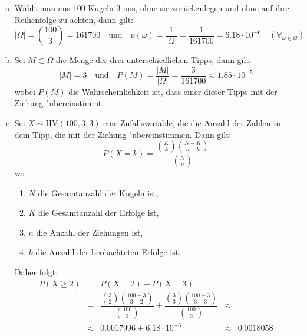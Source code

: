 \documentclass[10pt, oneside]{article}
\begin{document}
\begin{enumerate}[(a)]
    \item Wählt man aus 100 Kugeln 3 aus, ohne sie zurückzulegen und ohne auf
        ihre Reihenfolge zu achten, dann gilt:
        \begin{equation*}
            |\Omega| = \binom{100}{3} = 161700 \quad\text{und}\quad p(\omega) = \dfrac{1}{|\Omega|} = \dfrac{1}{161700} = 6.18 \cdot 10^{-6} \quad (\forall_{\omega \in \Omega})
        \end{equation*}
    \item Sei $M \subset \Omega$ die Menge der drei unterschiedlichen Tipps, dann gilt:
        \begin{equation*}
            |M| = 3 \quad\text{und}\quad P(M) = \dfrac{|M|}{|\Omega|} = \dfrac{3}{161700} \approx 1.85 \cdot 10^{-5}
        \end{equation*}
        wobei $P(M)$ die Wahrscheinlichkeit ist, dass einer dieser Tipps mit der Ziehung "ubereinstimmt.
    \pagebreak
    \item Sei $X \sim \text{HV}(100, 3, 3)$ eine Zufallsvariable, die die
        Anzahl der Zahlen in dem Tipp, die mit der Ziehung "ubereinstimmen.
        Dann gilt:
        \begin{equation}
            P(X = k) = \dfrac{\binom{K}{k}\binom{N - K}{n - k}}{\binom{N}{n}}
        \end{equation}
        wo
        \begin{enumerate}[-]
            \item $N$ die Gesamtanzahl der Kugeln ist,
            \item $K$ die Gesamtanzahl der Erfolge ist,
            \item $n$ die Anzahl der Ziehungen ist,
            \item $k$ die Anzahl der beobachteten Erfolge ist.
        \end{enumerate}
        \vspace{5pt}
        Daher folgt:
        \begin{equation*}
            \begin{array}{rcccl}
                P(X \geq 2) &=& P(X = 2) + P(X = 3) &=& \\[7.5pt]
                            &=& \dfrac{\binom{3}{2}\binom{100 - 3}{3 - 2}}{\binom{100}{3}} + \dfrac{\binom{3}{3}\binom{100 - 3}{3 - 3}}{\binom{100}{3}} &\approx& \\[15pt]
                      &\approx& 0.0017996 + 6.18 \cdot 10^{-6} &\approx& 0.0018058
            \end{array}
        \end{equation*}
\end{enumerate}
\end{document}
